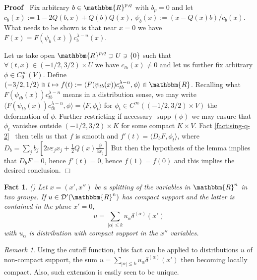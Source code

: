 \documentclass[12pt]{article}
\newcommand{\assign}{:=}
\newcommand{\tmop}[1]{\ensuremath{\operatorname{#1}}}
\renewenvironment{proof}{\noindent\textbf{Proof\ }}{\hspace*{\fill}$\Box$\medskip}
\newtheorem{fact}[proposition]{Fact}
\theoremstyle{remark}
\newtheorem{remark}[proposition]{Remark}
\newcommand{\D}{\mathcal{D}}
\newcommand{\supp}{\tmop{supp}}
\newcommand{\proofexplanation}[1]{(#1)}
\newcommand{\R}{\mathbbm{R}}
\newcommand{\mysbra}[1]{\left[ #1 \right]}
\begin{document}
\begin{proof}
  Fix arbitrary $b \in \R^{p, q}$ with $b_p = 0$ and let $c_b (x) \assign 1 -
  2 Q (b, x) + Q (b) Q (x)$, $\psi_b (x) \assign (x - Q (x) b) / c_b (x)$.
  What needs to be shown is that near $x = 0$ we have $F (x) = F (\psi_b (x))
  c_b^{\lambda - n} (x)$.
  
  Let us take open $\R^{p, q} \supset U \ni \{ 0 \}$ such that $\forall (t, x)
  \in (- 1 / 2, 3 / 2) \times U$ we have $c_{tb} (x) \neq 0$ and let us
  further fix arbitrary $\phi \in C_0^{\infty} (V)$. Define $(- 3 / 2, 1 / 2)
  \ni t \mapsto f (t) \assign \langle F (\psi_{tb} (x)) c_{tb}^{\lambda - n},
  \phi \rangle \in \R$. Recalling what $F (\psi_{tb} (x)) c_{tb}^{\lambda -
  n}$ means in a distribution sense, we may write $\langle F (\psi_{tb} (x))
  c_{tb}^{\lambda - n}, \phi \rangle = \langle F, \phi_t \rangle$ for $\phi_t
  \in C^{\infty} ((- 1 / 2, 3 / 2) \times V)$ the deformation of $\phi$.
  Further restricting if necessary $\supp (\phi)$ we may ensure that $\phi_t$
  vanishes outside $(- 1 / 2, 3 / 2) \times K$ for some compact $K \times V$.
  Fact \ref{fact:sing-q-2} \ then tells us that $f$ is smooth and $f' (t) =
  \langle D_b F, \phi_t \rangle$, where $D_b = \sum_j b_j \mysbra{2 \nu
  \varepsilon_j x_j + \frac{1}{2} Q (x) \frac{\partial}{\partial x_j}}$ But
  then the hypothesis of the lemma implies that $D_b F = 0$, hence $f' (t) =
  0$, hence $f (1) = f (0)$ and this implies the desired conclusion.
\end{proof}

\begin{fact}
{\proofexplanation{{\cite[Thm. 2.3.5]{hormander1983analysis}}}}
\label{fact:sing-q-3}Let $x = (x', x'')$ be a splitting of the variables in
$\R^n$ in two groups. If $u \in \D' (\R^n)$ has compact support and the latter
is contained in the plane $x' = 0$,
\[ u = \sum_{| \alpha | \leq k} u_{\alpha} \delta^{(\alpha)} (x') \]
with $u_{\alpha}$ is distribution with compact support in the $x''$
variables.
\end{fact}

\begin{remark}
  Using the cutoff function, this fact can be applied to distributions $u$ of
  non-compact support, the sum $u = \sum_{| \alpha | \leq k} u_{\alpha}
  \delta^{(\alpha)} (x')$ then becoming locally compact. Also, such extension
  is easily seen to be unique.
\end{remark}
\end{document}
